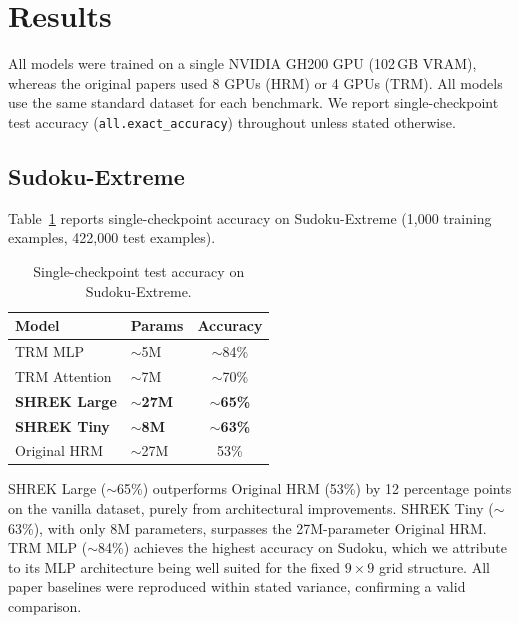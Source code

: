 \section{Results}
\label{sec:results}

All models were trained on a single NVIDIA GH200 GPU (102\,GB VRAM), whereas the original papers used 8 GPUs (HRM) or 4 GPUs (TRM). All models use the same standard dataset for each benchmark. We report single-checkpoint test accuracy (\texttt{all.exact\_accuracy}) throughout unless stated otherwise.

\subsection{Sudoku-Extreme}

Table~\ref{tab:sudoku} reports single-checkpoint accuracy on Sudoku-Extreme (1{,}000 training examples, 422{,}000 test examples).

\begin{table}[htbp]
    \centering
    \caption{Single-checkpoint test accuracy on Sudoku-Extreme.}
    \label{tab:sudoku}
    \begin{tabular}{llc}
        \toprule
        \textbf{Model}       & \textbf{Params}    & \textbf{Accuracy}   \\
        \midrule
        TRM MLP              & $\sim$5M           & $\sim$84\%          \\
        TRM Attention        & $\sim$7M           & $\sim$70\%          \\
        \textbf{SHREK Large} & \textbf{$\sim$27M} & \textbf{$\sim$65\%} \\
        \textbf{SHREK Tiny}  & \textbf{$\sim$8M}  & \textbf{$\sim$63\%} \\
        Original HRM         & $\sim$27M          & 53\%                \\
        \bottomrule
    \end{tabular}
\end{table}

SHREK Large ($\sim$65\%) outperforms Original HRM (53\%) by 12 percentage points on the vanilla dataset, purely from architectural improvements. SHREK Tiny ($\sim$63\%), with only 8M parameters, surpasses the 27M-parameter Original HRM. TRM MLP ($\sim$84\%) achieves the highest accuracy on Sudoku, which we attribute to its MLP architecture being well suited for the fixed $9 \times 9$ grid structure. All paper baselines were reproduced within stated variance, confirming a valid comparison.

